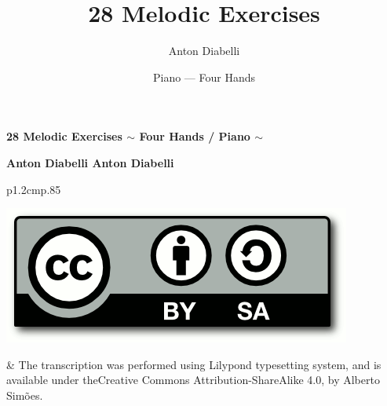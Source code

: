 \documentclass{book}
\title{28 Melodic Exercises}
\author{Anton Diabelli}
\date{Piano --- Four Hands}
\begin{document}
\thispagestyle{empty}
\mbox{}\vfill
\begin{center}
	
	\huge\bfseries{}
	\huge  28 Melodic Exercises 
	\vskip 1cm
	\huge\bfseries{}
	\Large $\sim$ Four Hands / Piano $\sim$
\end{center}
\vfill\vfill
\begin{center}
	\huge\bfseries{}
	Anton Diabelli
	\vskip -22mm
	\huge\bfseries{}
	Anton Diabelli
\end{center}
\vfill
\mbox{}\newpage
\pagestyle{plain}





\mbox{}\vfill
\begin{tabular}{p{1.2cm}p{.85\linewidth}}
\begin{minipage}{1cm}
\vskip 3mm
\includegraphics[scale=.1]{ccbysa.png}
\end{minipage} & The transcription was performed using Lilypond typesetting system, and is available under the\newline Creative Commons Attribution-ShareAlike 4.0, by Alberto Simões.
\end{tabular}
\end{document}
